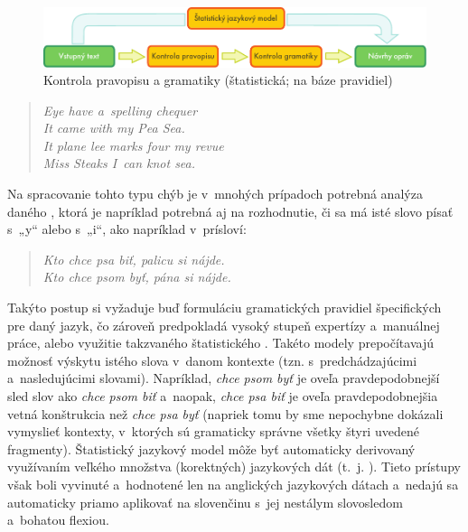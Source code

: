 \begin{multicols}{2}
\begin{figure}[htb]
  \center
  \includegraphics[width=\textwidth]{../_media/slovak/language_checking}
  \caption{Kontrola pravopisu a gramatiky (štatistická; na báze pravidiel)}
  \label{fig:langcheckingaarch_sk}
\end{figure}

\begin{verse}
\emph{%
Eye have a~spelling chequer\\
It came with my Pea Sea.\\
It plane lee marks four my revue\\
Miss Steaks I~can knot sea.
}
\end{verse}

Na spracovanie tohto typu chýb je v~mnohých prípadoch potrebná analýza daného , ktorá je napríklad potrebná aj na rozhodnutie, či sa má isté slovo písať s~„y“ alebo s~„i“, ako napríklad v~prísloví:

\begin{verse}
\emph{%
Kto chce psa biť, palicu si nájde.\\
\smallskip
Kto chce psom byť, pána si nájde.
}
\end{verse}

Takýto postup si vyžaduje buď formuláciu gramatických
pravidiel špecifických pre daný jazyk, čo zároveň predpokladá
vysoký stupeň expertízy a~manuálnej práce, alebo využitie
takzvaného štatistického . Takéto
modely prepočítavajú možnosť výskytu istého slova v~danom kontexte
(tzn. s~predchádzajúcimi a~nasledujúcimi slovami). Napríklad,
\emph{chce psom byť} je oveľa pravdepodobnejší sled slov ako
\emph{chce psom biť} a~naopak, \emph{chce psa biť} je oveľa
pravdepodobnejšia vetná konštrukcia než \emph{chce psa byť}
(napriek tomu by sme nepochybne dokázali vymyslieť kontexty,
v~ktorých sú gramaticky správne všetky štyri uvedené fragmenty).
Štatistický jazykový model môže byť automaticky derivovaný
využívaním veľkého množstva (korektných) jazykových dát (t.~j.
). Tieto prístupy však boli vyvinuté a~hodnotené
len na anglických jazykových dátach a~nedajú sa automaticky priamo
aplikovať na slovenčinu s~jej nestálym slovosledom a~bohatou flexiou.


\end{multicols}
